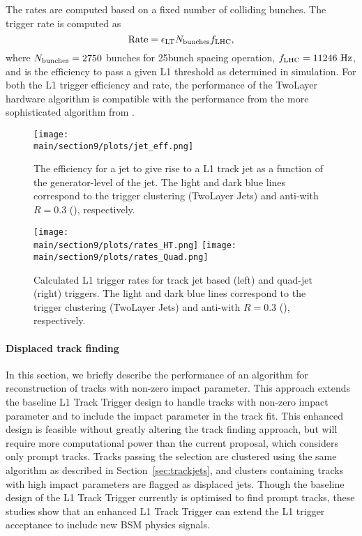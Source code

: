 The rates are computed based on a fixed number of colliding bunches. The trigger rate is computed as
\begin{equation*}
  \text{Rate} = \epsilon_\mathrm{LT} N_\mathrm{bunches} f_\mathrm{LHC},
\end{equation*}
where $N_\mathrm{bunches}=2750$ bunches for 25\Uns bunch spacing operation, $\fLHC = 11246\UHz$, and \effLT is the efficiency to pass a given L1 threshold as determined
in simulation. For both the L1 trigger efficiency and rate, the performance of the TwoLayer hardware algorithm is compatible with the performance from the more sophisticated algorithm
from \FASTJET.

\begin{figure*}[hbtp]\centering
 \texttt{[image: \\main/section9/plots/jet\_eff.png]}
 \caption{The efficiency for a jet to give rise to a L1 track jet as a function of the generator-level \pt of the jet.
 The light and dark blue lines correspond to the trigger clustering (TwoLayer Jets) and anti-\kt with $R =0.3$ (\FASTJET), respectively.}
  \label{fig:jeteff}
\end{figure*}%

\begin{figure*}[hbtp]\centering
 \texttt{[image: \\main/section9/plots/rates\_HT.png]}
 \texttt{[image: \\main/section9/plots/rates\_Quad.png]}
 \caption{Calculated L1 trigger rates for track jet based \HT (left) and quad-jet (right) triggers.
 The light and dark blue lines correspond to the trigger clustering (TwoLayer Jets) and anti-\kt with $R =0.3$ (\FASTJET), respectively.}
  \label{fig:rates}
\end{figure*}%

\paragraph{Displaced track finding}

In this section, we briefly describe the performance of an algorithm for reconstruction of tracks with non-zero impact parameter. This approach extends the baseline L1 Track Trigger design to 
handle tracks with non-zero impact parameter and to include the impact parameter in the track fit. This enhanced design is feasible without greatly altering the track finding approach, but will 
require more computational power than the current proposal, which considers only prompt tracks. Tracks passing the selection are clustered using the same algorithm as described in Section~\ref{sec:trackjets}, 
and clusters containing tracks with high impact parameters are flagged as displaced jets. Though the baseline design of the L1 Track Trigger currently is optimised to find prompt tracks, these 
studies show that an enhanced L1 Track Trigger can extend the L1 trigger acceptance to include new BSM physics signals.

